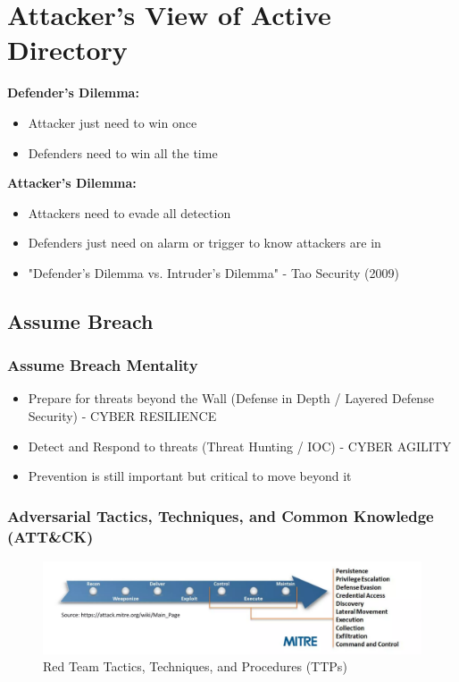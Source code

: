\chapter{Attacker's View of Active Directory}

\textbf{Defender's Dilemma:}
\begin{itemize}
    \item Attacker just need to win once
    \item Defenders need to win all the time
    \end{itemize}

    \textbf{Attacker's Dilemma:}
    \begin{itemize}
        \item Attackers need to evade all detection
        \item Defenders just need on alarm or trigger to know attackers are in
        \item "Defender's Dilemma vs. Intruder's Dilemma" - Tao Security (2009)
    \end{itemize}

\section{Assume Breach}

\subsection{Assume Breach Mentality}
\begin{itemize}
    \item Prepare for threats beyond the Wall (Defense in Depth / Layered Defense Security) - CYBER RESILIENCE
    \item Detect and Respond to threats (Threat Hunting / IOC) - CYBER AGILITY
    \item Prevention is still important but critical to move beyond it

\end{itemize}

\subsection{Adversarial Tactics, Techniques, and Common Knowledge (ATT\&CK)}

\begin{figure}
    \centering
    \includegraphics[width=0.75\linewidth]{mitreattack.png}
    \caption{Red Team Tactics, Techniques, and Procedures (TTPs)}
    \label{fig:placeholder}
\end{figure}

